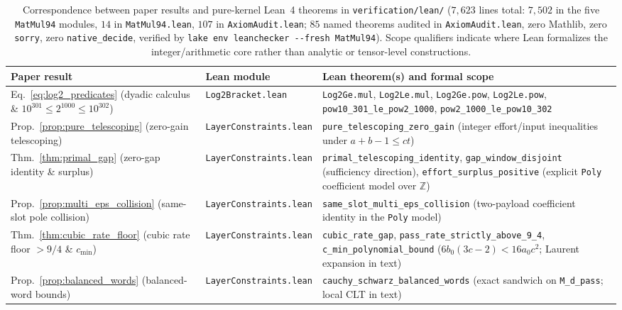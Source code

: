 \documentclass[11pt,a4paper]{article}
\theoremstyle{plain}
\theoremstyle{definition}
\theoremstyle{remark}
\newcommand{\Z}{\mathbb{Z}}
\begin{document}
\begin{landscape}
\begin{table}[!htbp]
\centering
\scriptsize
\caption{Correspondence between paper results and pure-kernel Lean~4 theorems in \texttt{verification/lean/} ($7{,}623$ lines total: $7{,}502$ in the five \texttt{MatMul94} modules, $14$ in \texttt{MatMul94.lean}, $107$ in \texttt{AxiomAudit.lean}; $85$ named theorems audited in \texttt{AxiomAudit.lean}, zero Mathlib, zero \texttt{sorry}, zero \texttt{native\_decide}, verified by \texttt{lake env leanchecker {-}{-}fresh MatMul94}). Scope qualifiers indicate where Lean formalizes the integer/arithmetic core rather than analytic or tensor-level constructions.}
\label{tab:lean_map}
\begin{tabular}{@{} >{\raggedright\arraybackslash}p{6.0cm} l >{\raggedright\arraybackslash}p{13.4cm} @{}}
\toprule
\textbf{Paper result} & \textbf{Lean module} & \textbf{Lean theorem(s) and formal scope} \\
\midrule
Eq.~\eqref{eq:log2_predicates} (dyadic calculus \& $10^{301} \le 2^{1000} \le 10^{302}$) & \texttt{Log2Bracket.lean} & \texttt{Log2Ge.mul}, \texttt{Log2Le.mul}, \texttt{Log2Ge.pow}, \texttt{Log2Le.pow}, \texttt{pow10\_301\_le\_pow2\_1000}, \texttt{pow2\_1000\_le\_pow10\_302} \\
Prop.~\ref{prop:pure_telescoping} (zero-gain telescoping) & \texttt{LayerConstraints.lean} & \texttt{pure\_telescoping\_zero\_gain} (integer effort/input inequalities under $a + b - 1 \le ct$) \\
Thm.~\ref{thm:primal_gap} (zero-gap identity \& surplus) & \texttt{LayerConstraints.lean} & \texttt{primal\_telescoping\_identity}, \texttt{gap\_window\_disjoint} (sufficiency direction), \texttt{effort\_surplus\_positive} (explicit \texttt{Poly} coefficient model over $\Z$) \\
Prop.~\ref{prop:multi_eps_collision} (same-slot pole collision) & \texttt{LayerConstraints.lean} & \texttt{same\_slot\_multi\_eps\_collision} (two-payload coefficient identity in the \texttt{Poly} model) \\
Thm.~\ref{thm:cubic_rate_floor} (cubic rate floor $> 9/4$ \& $c_{\min}$) & \texttt{LayerConstraints.lean} & \texttt{cubic\_rate\_gap}, \texttt{pass\_rate\_strictly\_above\_9\_4}, \texttt{c\_min\_polynomial\_bound} ($6 b_0(3c - 2) < 16 a_0 c^2$; Laurent expansion in text) \\
Prop.~\ref{prop:balanced_words} (balanced-word bounds) & \texttt{LayerConstraints.lean} & \texttt{cauchy\_schwarz\_balanced\_words} (exact sandwich on \texttt{M\_d\_pass}; local CLT in text) \\

\end{tabular}
\end{table}
\end{landscape}
\end{document}
